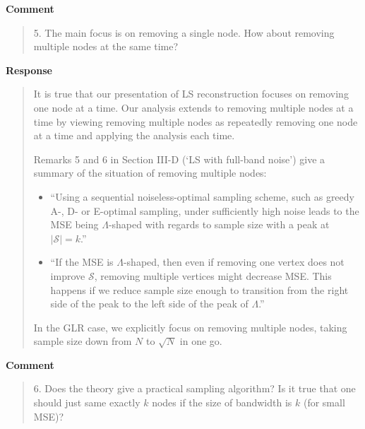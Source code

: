 \documentclass[11pt,onecolumn,journal]{IEEEtran}
\theoremstyle{definition}
\newcommand{\set}[1]{\mathcal{#1}}
\begin{document}
\textbf{Comment}
\begin{quote}
5. The main focus is on removing a single node. How about removing multiple nodes at the same time?
\end{quote}

\textbf{Response}
\begin{quote}
It is true that our presentation of LS reconstruction focuses on removing one node at a time. Our analysis extends to removing multiple nodes at a time by viewing removing multiple nodes as repeatedly removing one node at a time and applying the analysis each time.

Remarks 5 and 6 in Section III-D (`LS with full-band noise') give a summary of the situation of removing multiple nodes:
\begin{itemize}
\item ``Using a sequential noiseless-optimal sampling scheme, such as greedy A-, D- or E-optimal sampling, under sufficiently high noise leads to the MSE being $\Lambda$-shaped with regards to sample size with a peak at $|\set{S}| = k$.''
\item ``If the MSE is $\Lambda$-shaped, then even if removing one vertex does not improve $\set{S}$, removing multiple vertices might decrease MSE. This happens if we reduce sample size enough to transition from the right side of the peak to the left side of the peak of $\Lambda$.''
\end{itemize}

In the GLR case, we explicitly focus on removing multiple nodes, taking sample size down from $N$ to $\sqrt{N}$ in one go.
\end{quote}

\textbf{Comment}
\begin{quote}
6. Does the theory give a practical sampling algorithm? Is it true that one should just same exactly $k$ nodes if the size of bandwidth is $k$ (for small MSE)?
\end{quote}
\end{document}
